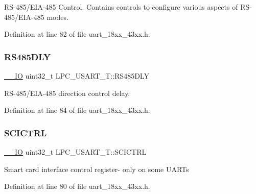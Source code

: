 R\+S-\/485/\+E\+I\+A-\/485 Control. Contains controls to configure various aspects of R\+S-\/485/\+E\+I\+A-\/485 modes. 

Definition at line 82 of file uart\+\_\+18xx\+\_\+43xx.\+h.

\mbox{\label{struct_l_p_c___u_s_a_r_t___t_a6e9fc8109a269820386a36c81dc943ab}} 
\subsubsection{\texorpdfstring{R\+S485\+D\+LY}{RS485DLY}}
{\footnotesize\ttfamily \hyperlink{core__sc300_8h_aec43007d9998a0a0e01faede4133d6be}{\+\_\+\+\_\+\+IO} uint32\+\_\+t L\+P\+C\+\_\+\+U\+S\+A\+R\+T\+\_\+\+T\+::\+R\+S485\+D\+LY}

R\+S-\/485/\+E\+I\+A-\/485 direction control delay. 

Definition at line 84 of file uart\+\_\+18xx\+\_\+43xx.\+h.

\mbox{\label{struct_l_p_c___u_s_a_r_t___t_aa8ad1461441995d0b618ff7f5b0e42be}} 
\subsubsection{\texorpdfstring{S\+C\+I\+C\+T\+RL}{SCICTRL}}
{\footnotesize\ttfamily \hyperlink{core__sc300_8h_aec43007d9998a0a0e01faede4133d6be}{\+\_\+\+\_\+\+IO} uint32\+\_\+t L\+P\+C\+\_\+\+U\+S\+A\+R\+T\+\_\+\+T\+::\+S\+C\+I\+C\+T\+RL}

Smart card interface control register-\/ only on some U\+A\+R\+Ts 

Definition at line 80 of file uart\+\_\+18xx\+\_\+43xx.\+h.

\mbox{\label{struct_l_p_c___u_s_a_r_t___t_a28417e4b3d19fcbb6c6ef116376ed58b}} 

